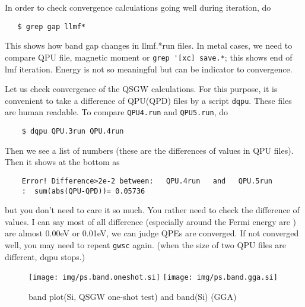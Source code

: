 \documentclass[a4paper,10pt,epsf,fleqn]{article}
\begin{document}
In order to check convergence calculations going well during iteration, do
\begin{verbatim}
   $ grep gap llmf*
\end{verbatim}
This shows how band gap changes in llmf.*run files.
In metal cases, we need to compare QPU file, magnetic moment or
\verb+grep '[xc] save.*+; this shows end of lmf iteration.
Energy is not so meaningful but can be indicator to convergence.

Let us check convergence of the QSGW calculations.
For this purpose, it is convenient to take a difference of QPU(QPD) files
by a script \verb+dqpu+. These files are human readable.
To compare \verb+QPU4.run+ and \verb+QPU5.run+, do
\begin{verbatim}
    $ dqpu QPU.3run QPU.4run
\end{verbatim}
Then we see a list of numbers (these are the differences of values in
QPU files).  Then it shows at the bottom as
\begin{verbatim}
    Error! Difference>2e-2 between:   QPU.4run   and   QPU.5run  
    :  sum(abs(QPU-QPD))= 0.05736
\end{verbatim}
but you don't need to care it so much.
You rather need to check the difference of values.
I can say most of all difference (especially around the Fermi energy are
) are almost 0.00eV or 0.01eV, we can judge QPEs are converged.
If not converged well, you may need to repeat 
\verb+gwsc+ again.
(when the size of two QPU files are different, dqpu stops.)

\begin{figure}[h]
 \begin{center}
  \texttt{[image: img/ps.band.oneshot.si]}
  \texttt{[image: img/ps.band.gga.si]}
  \caption{band plot(Si, QSGW one-shot test)    and    band(Si) (GGA)}
 \end{center}
\end{figure}


\end{document}
